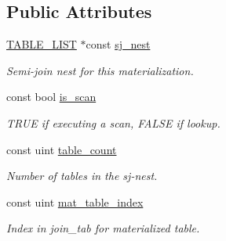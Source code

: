 \subsection*{Public Attributes}
\begin{DoxyCompactItemize}
\item 
\mbox{\label{classSemijoin__mat__exec_a8f658f0000b03662f190189032cda0b4}} 
\mbox{\hyperlink{structTABLE__LIST}{T\+A\+B\+L\+E\+\_\+\+L\+I\+ST}} $\ast$const \mbox{\hyperlink{classSemijoin__mat__exec_a8f658f0000b03662f190189032cda0b4}{sj\+\_\+nest}}
\begin{DoxyCompactList}\small\item\em Semi-\/join nest for this materialization. \end{DoxyCompactList}\item 
\mbox{\label{classSemijoin__mat__exec_a216db4b75a23aefee9256e0bdeddda9d}} 
const bool \mbox{\hyperlink{classSemijoin__mat__exec_a216db4b75a23aefee9256e0bdeddda9d}{is\+\_\+scan}}
\begin{DoxyCompactList}\small\item\em T\+R\+UE if executing a scan, F\+A\+L\+SE if lookup. \end{DoxyCompactList}\item 
\mbox{\label{classSemijoin__mat__exec_adda1225326ac660e195cb3417b8a9348}} 
const uint \mbox{\hyperlink{classSemijoin__mat__exec_adda1225326ac660e195cb3417b8a9348}{table\+\_\+count}}
\begin{DoxyCompactList}\small\item\em Number of tables in the sj-\/nest. \end{DoxyCompactList}\item 
\mbox{\label{classSemijoin__mat__exec_a816cc5491db4c3f65592b8bf8abb1ed2}} 
const uint \mbox{\hyperlink{classSemijoin__mat__exec_a816cc5491db4c3f65592b8bf8abb1ed2}{mat\+\_\+table\+\_\+index}}
\begin{DoxyCompactList}\small\item\em Index in join\+\_\+tab for materialized table. \end{DoxyCompactList}\item 
\mbox{\label{classSemijoin__mat__exec_a67e7548cf5367c2c2a3f5620849856cb}} 

\end{DoxyCompactItemize}
